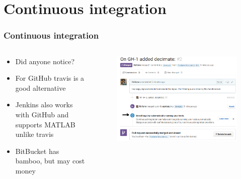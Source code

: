 \section[Continuous integration]{Continuous integration}
\begin{frame}
	\frametitle{Continuous integration}
	\begin{columns}
		\begin{column}{0.4\textwidth}
			\begin{itemize}[<+->]
				\item Did anyone notice?
				\item For GitHub travis is a good alternative
				\item Jenkins also works with GitHub and supports MATLAB unlike travis
				\item BitBucket has bamboo, but may cost money
			\end{itemize}
		\end{column}
		\begin{column}{0.6\textwidth}
			\begin{figure}
				\centering
				\includegraphics[width=\textwidth]{./pictures/cont.png}
			\end{figure}
		\end{column}
	\end{columns}
\end{frame}
